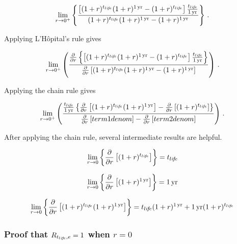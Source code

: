 \begin{equation}
  \lim_{r \to 0^+} \left\{
  \frac{\left[(1 + r)^{\tlife} (1 + r)^{\oneyr} - (1 + r)^{\tlife} \right] \frac{\tlife}{\oneyr}}{(1 + r)^{\tlife} (1 + r)^{\oneyr} - (1 + r)^{\oneyr}}
  \right\} \, .
\end{equation}

Applying L'H\^{o}pital's rule gives

\begin{equation}
  \lim_{r \to 0^+} \left(
  \frac{\frac{\partial}{\partial r} \left\{ \left[(1 + r)^{\tlife} (1 + r)^{\oneyr} - (1 + r)^{\tlife} \right] \frac{\tlife}{\oneyr} \right\}}
  {\frac{\partial}{\partial r} \left[ (1 + r)^{\tlife} (1 + r)^{\oneyr} - (1 + r)^{\oneyr}\right]}
  \right) \, .
\end{equation}

Applying the chain rule gives

\begin{equation}
  \lim_{r \to 0^+} \left(
  \frac{\frac{t_{li\!f\!e}}{1\,\mathrm{yr}} 
      \left\{ \frac{\partial}{\partial r} \left[  (1 + r)^{t_{li\!f\!e}} (1 + r)^{1\,\mathrm{yr}} \right]  - 
              \frac{\partial}{\partial r} \left[  (1 + r)^{t_{li\!f\!e}} \right] 
      \right\}}
  {\frac{\partial}{\partial r} \left[  term1denom \right]  - 
              \frac{\partial}{\partial r} \left[  term2denom \right] }
  \right) \, .
\end{equation}
%

After applying the chain rule, 
several intermediate results are helpful.

\begin{equation}
  \lim_{r \to 0} \left\{\frac{\partial}{\partial r} \left[ (1 + r)^{t_{li\!f\!e}} \right] \right\} = t_{li\!f\!e}
\end{equation}

\begin{equation}
  \lim_{r \to 0} \left\{\frac{\partial}{\partial r} \left[ (1 + r)^{1\,\mathrm{yr}} \right] \right\} = 1\,\mathrm{yr}
\end{equation}

\begin{equation}
  \lim_{r \to 0} \left\{\frac{\partial}{\partial r} \left[ (1 + r)^{t_{li\!f\!e}} (1 + r)^{1\,\mathrm{yr}} \right] \right\} = t_{li\!f\!e} (1 + r)^{1\,\mathrm{yr}}  + 1\,\mathrm{yr} (1 + r)^{t_{li\!f\!e}} 
\end{equation}


\subsubsection{Proof that $R_{t_{li\!f\!e},e} = 1$ when $r = 0$}
